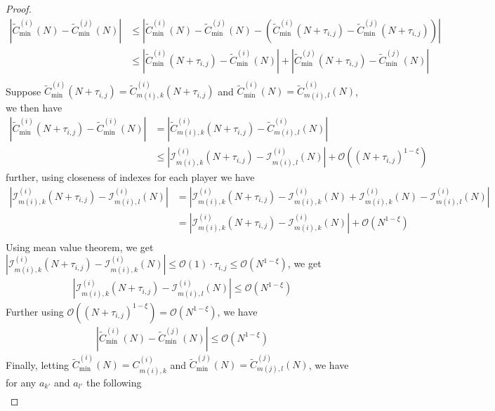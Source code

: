 \documentclass{article}
\begin{document}
\begin{proof}
\begin{align*}
    |\tilde{C}^{(i)}_{\min}(N)-\tilde{C}^{(j)}_{\min}(N)|&\leq |\tilde{C}^{(i)}_{\min}(N)-\tilde{C}^{(j)}_{\min}(N)- (\tilde{C}^{(i)}_{\min}(N+\tau_{i,j})-\tilde{C}^{(j)}_{\min}(N+\tau_{i,j}))|\\
    &\leq |\tilde{C}^{(i)}_{\min}(N+\tau_{i,j})-\tilde{C}^{(i)}_{\min}(N)| + |\tilde{C}^{(j)}_{\min}(N+\tau_{i,j})-\tilde{C}^{(j)}_{\min}(N)|\\
\end{align*}
Suppose $\tilde{C}^{(i)}_{\min}(N+\tau_{i,j})=\tilde{C}^{(i)}_{m(i),k}(N+\tau_{i,j})$ and $\tilde{C}^{(i)}_{\min}(N)=\tilde{C}^{(i)}_{m(i),l}(N)$, we then have
\begin{align*}
     |\tilde{C}^{(i)}_{\min}(N+\tau_{i,j})-\tilde{C}^{(i)}_{\min}(N)| &= |\tilde{C}^{(i)}_{m(i),k}(N+\tau_{i,j})-\tilde{C}^{(i)}_{m(i),l}(N)| \\
     &\leq |\mathcal{I}^{(i)}_{m(i),k}(N+\tau_{i,j})-\mathcal{I}^{(i)}_{m(i),l}(N)|  +\mathcal{O}\left((N+\tau_{i,j})^{1-\xi}\right)
\end{align*}
further, using closeness of indexes for each player we have
\begin{align*}
    |\mathcal{I}^{(i)}_{m(i),k}(N+\tau_{i,j})-\mathcal{I}^{(i)}_{m(i),l}(N)| &=  |\mathcal{I}^{(i)}_{m(i),k}(N+\tau_{i,j})-\mathcal{I}^{(i)}_{m(i),k}(N)+\mathcal{I}^{(i)}_{m(i),k}(N)-\mathcal{I}^{(i)}_{m(i),l}(N)| \\
    &= |\mathcal{I}^{(i)}_{m(i),k}(N+\tau_{i,j})-\mathcal{I}^{(i)}_{m(i),k}(N)|+\mathcal{O}(N^{1-\xi})\\
\end{align*}
Using mean value theorem, we get $|\mathcal{I}^{(i)}_{m(i),k}(N+\tau_{i,j})-\mathcal{I}^{(i)}_{m(i),k}(N)| \leq \mathcal{O}(1)\cdot \tau_{i,j}\leq \mathcal{O}(N^{1-\xi})$, we get
\begin{align*}
     |\mathcal{I}^{(i)}_{m(i),k}(N+\tau_{i,j})-\mathcal{I}^{(i)}_{m(i),l}(N)|\leq \mathcal{O}(N^{1-\xi})
\end{align*}
 Further using $\mathcal{O}\left((N+\tau_{i,j})^{1-\xi}\right)= \mathcal{O}(N^{1-\xi})$, we have
 \begin{align*}
     |\tilde{C}^{(i)}_{\min}(N)-\tilde{C}^{(j)}_{\min}(N)| \leq \mathcal{O}(N^{1-\xi})
 \end{align*}
 Finally, letting $\tilde{C}^{(i)}_{\min}(N)=C^{(i)}_{m(i),k}$ and $\tilde{C}^{(j)}_{\min}(N)=\tilde{C}^{(j)}_{m(j),l}(N)$, we have for any $a_{k'}$ and $a_{l'}$ the following
 \begin{align*}

\end{align*}
\end{proof}
\end{document}
